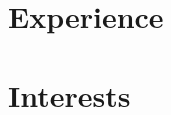 \documentclass[letterpaper]{twentysecondcv} %
\begin{document}

\section*{Experience}

\experience







\section*{Interests}

\interests
\end{document}
